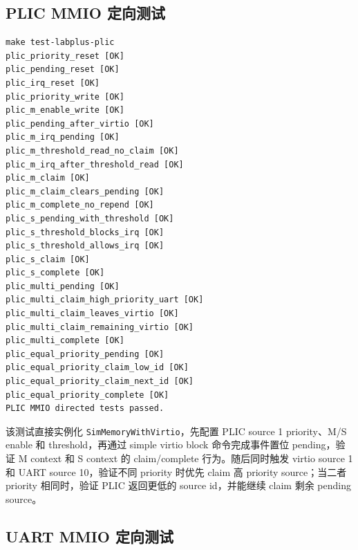\documentclass[UTF8,a4paper,11pt]{ctexart}
\begin{document}
\subsection{PLIC MMIO 定向测试}

\begin{Verbatim}[fontsize=\small]
make test-labplus-plic
plic_priority_reset [OK]
plic_pending_reset [OK]
plic_irq_reset [OK]
plic_priority_write [OK]
plic_m_enable_write [OK]
plic_pending_after_virtio [OK]
plic_m_irq_pending [OK]
plic_m_threshold_read_no_claim [OK]
plic_m_irq_after_threshold_read [OK]
plic_m_claim [OK]
plic_m_claim_clears_pending [OK]
plic_m_complete_no_repend [OK]
plic_s_pending_with_threshold [OK]
plic_s_threshold_blocks_irq [OK]
plic_s_threshold_allows_irq [OK]
plic_s_claim [OK]
plic_s_complete [OK]
plic_multi_pending [OK]
plic_multi_claim_high_priority_uart [OK]
plic_multi_claim_leaves_virtio [OK]
plic_multi_claim_remaining_virtio [OK]
plic_multi_complete [OK]
plic_equal_priority_pending [OK]
plic_equal_priority_claim_low_id [OK]
plic_equal_priority_claim_next_id [OK]
plic_equal_priority_complete [OK]
PLIC MMIO directed tests passed.
\end{Verbatim}

该测试直接实例化 \texttt{SimMemoryWithVirtio}，先配置 PLIC source 1 priority、M/S enable 和 threshold，再通过 simple virtio block 命令完成事件置位 pending，验证 M context 和 S context 的 claim/complete 行为。随后同时触发 virtio source 1 和 UART source 10，验证不同 priority 时优先 claim 高 priority source；当二者 priority 相同时，验证 PLIC 返回更低的 source id，并能继续 claim 剩余 pending source。

\subsection{UART MMIO 定向测试}
\end{document}
